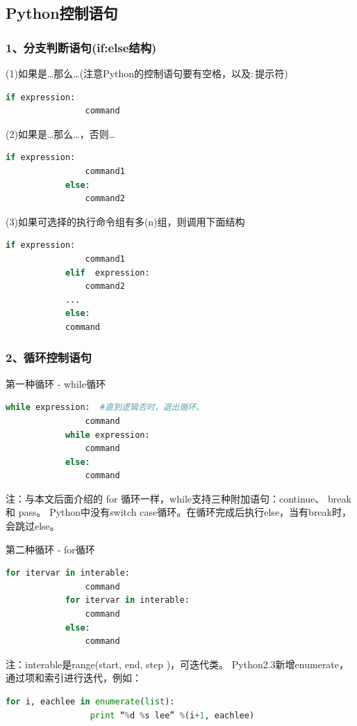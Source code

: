     \subsection{Python控制语句}
        \subsubsection{1、分支判断语句(if:else结构)}
            (1)如果是…那么…(注意Python的控制语句要有空格，以及$:$提示符)
                \begin{lstlisting}[language=Python]
            if expression:
                command
                \end{lstlisting}
            \par
            (2)如果是…那么…，否则…
                \begin{lstlisting}[language=Python]
            if expression:
                command1
            else:
                command2
                \end{lstlisting}
            \par
            (3)如果可选择的执行命令组有多(n)组，则调用下面结构
                \begin{lstlisting}[language=Python]
            if expression:
                command1
            elif  expression:
                command2
            ...
            else:
            command
                \end{lstlisting}
        \subsubsection{2、循环控制语句}
            第一种循环 - while循环
            \begin{lstlisting}[language=Python]
            while expression:  #直到逻辑否时，退出循环。
                command
            while expression:
                command
            else:
                command
            \end{lstlisting}
            注：与本文后面介绍的 for 循环一样，while支持三种附加语句：continue、 break和 pass。
            Python中没有switch case循环。在循环完成后执行else，当有break时，会跳过else。
            \par
            第二种循环 - for循环
            \begin{lstlisting}[language=Python]
            for itervar in interable:
                command
            for itervar in interable:
                command
            else:
                command
            \end{lstlisting}
            注：interable是range(start, end, step )，可迭代类。
            Python2.3新增enumerate，通过项和索引进行迭代，例如：
                \begin{lstlisting}[language=Python]
            for i, eachlee in enumerate(list):
                 print “%d %s lee” %(i+1, eachlee)
                \end{lstlisting}

